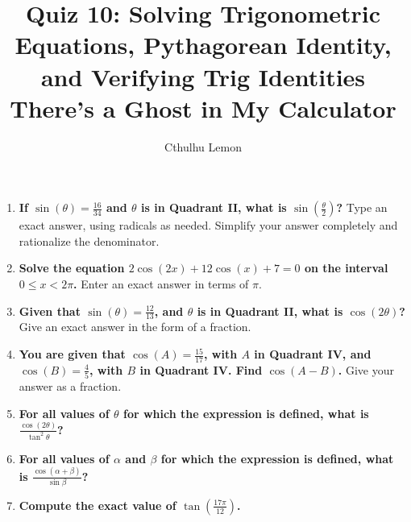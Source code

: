 \documentclass[12pt]{article}
\title{
    \vspace{2in}
    \textbf{Quiz 10: Solving Trigonometric Equations, Pythagorean Identity, and Verifying Trig Identities}\\
    \vspace{0.1in}
    \large There's a Ghost in My Calculator\\
    \vspace{3in}
}
\author{Cthulhu Lemon}
\date{}
\begin{document}
\maketitle
\newpage

\begin{enumerate}
    \item \textbf{If \( \sin(\theta) = \frac{16}{34} \) and \( \theta \) is in Quadrant II, what is \( \sin\left(\frac{\theta}{2}\right) \)?} Type an exact answer, using radicals as needed. Simplify your answer completely and rationalize the denominator.
    \vspace{45mm}

    \item \textbf{Solve the equation \( 2\cos(2x) + 12\cos(x) + 7 = 0 \) on the interval \( 0 \leq x < 2\pi \).} Enter an exact answer in terms of \(\pi\).
    \vspace{45mm}
    \item \textbf{Given that \( \sin(\theta) = \frac{12}{13} \), and \( \theta \) is in Quadrant II, what is \( \cos(2\theta) \)?} Give an exact answer in the form of a fraction.
    \vspace{45mm}

    
    \item \textbf{You are given that \( \cos(A) = \frac{15}{17} \), with \( A \) in Quadrant IV, and \( \cos(B) = \frac{4}{5} \), with \( B \) in Quadrant IV. Find \( \cos(A - B) \).} Give your answer as a fraction.
    \vspace{45mm}

    \item \textbf{For all values of \( \theta \) for which the expression is defined, what is \( \frac{\cos(2\theta)}{\tan^2\theta} \)?}
    \vspace{45mm}

    \item \textbf{For all values of \( \alpha \) and \( \beta \) for which the expression is defined, what is \( \frac{\cos(\alpha+\beta)}{\sin \beta} \)?}
    \vspace{45mm}

    \item \textbf{Compute the exact value of \( \tan\left(\frac{17\pi}{12}\right) \).}
    \vspace{45mm}


\end{enumerate}
\end{document}
